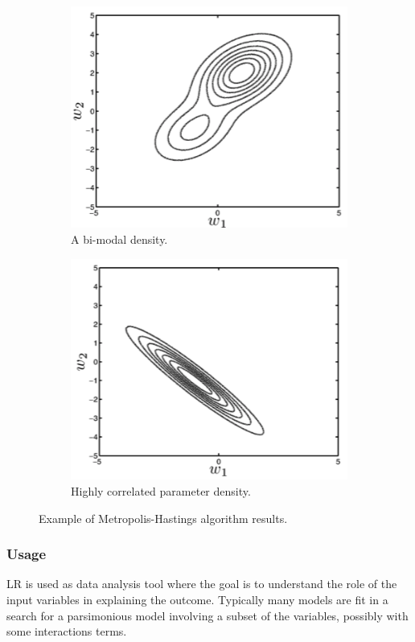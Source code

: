 \begin{figure}
\begin{subfigure}{.5\textwidth}
\centering
\includegraphics[width=.8\linewidth]{img/mode1}
\caption{A bi-modal density.}
\label{mode1}
\end{subfigure}
\begin{subfigure}{.5\textwidth}
\centering
\includegraphics[width=.8\linewidth]{img/mode2}
\caption{Highly correlated parameter density.}
\label{mode2}
\end{subfigure}
\caption{Example of Metropolis-Hastings algorithm results.}
\end{figure}

\subsubsection{Usage}
LR is used as data analysis tool where the goal is to  understand the role of the input variables in explaining the outcome. Typically many models are fit in a search for a parsimonious model involving a subset of the variables, possibly with some interactions terms. 


